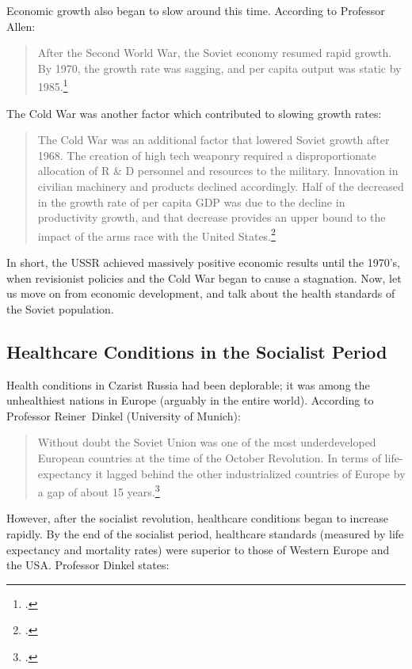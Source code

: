 Economic growth also began to slow around this time. According to
Professor Allen:

\begin{quote}
After the Second World War, the Soviet economy resumed rapid growth. By
1970, the growth rate was sagging, and per capita output was static by
  1985.\footcite{allen2003farm}
\end{quote}

The Cold War was another factor which contributed to slowing growth
rates:

\begin{quote}
The Cold War was an additional factor that lowered Soviet growth after
1968. The creation of high tech weaponry required a disproportionate
allocation of R \& D personnel and resources to the military. Innovation
in civilian machinery and products declined accordingly. Half of the
decreased in the growth rate of per capita GDP was due to the decline in
productivity growth, and that decrease provides an upper bound to the
  impact of the arms race with the United States.\footcite{allen2003farm}
\end{quote}

In short, the USSR achieved massively positive economic results until
the 1970's, when revisionist policies and the Cold War began to cause a
stagnation. Now, let us move on from economic development, and talk
about the health standards of the Soviet population.

\subsection*{Healthcare Conditions in the Socialist Period}

Health conditions in Czarist Russia had been deplorable; it was among
the unhealthiest nations in Europe (arguably in the entire world).
According to Professor Reiner~Dinkel (University of Munich):

\begin{quote}
Without doubt the Soviet Union was one of the most underdeveloped
European countries at the time of the October Revolution. In terms of
life-expectancy it lagged behind the other industrialized countries of
  Europe by a gap of about 15 years.\footcite{dinkel1986declining}
\end{quote}

However, after the socialist revolution, healthcare conditions began to
increase rapidly. By the end of the socialist period, healthcare
standards (measured by life expectancy and mortality rates) were
superior to those of Western Europe and the USA. Professor Dinkel
states:

